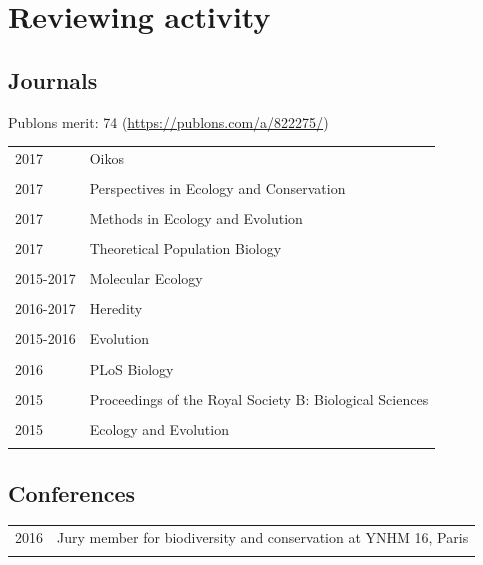 \documentclass[a4paper,10pt]{article} %
\begin{document}
\section*{Reviewing activity}
\subsection*{Journals}
Publons merit: 74 (\url{https://publons.com/a/822275/})
\begin{table}[h]
\begin{tabular}{p{4cm}|p{11cm}}
\hfill \textsc{2017} & Oikos\\
\multicolumn{2}{c}{} \\
\hfill \textsc{2017} & Perspectives in Ecology and Conservation\\
\multicolumn{2}{c}{} \\
\hfill \textsc{2017} & Methods in Ecology and Evolution\\
\multicolumn{2}{c}{} \\
\hfill \textsc{2017} & Theoretical Population Biology\\
\multicolumn{2}{c}{} \\
\hfill \textsc{2015-2017} & Molecular Ecology\\
\multicolumn{2}{c}{} \\
\hfill \textsc{2016-2017} & Heredity\\
\multicolumn{2}{c}{} \\
\hfill \textsc{2015-2016} & Evolution\\
\multicolumn{2}{c}{} \\
\hfill \textsc{2016} & PLoS Biology\\
\multicolumn{2}{c}{} \\
\hfill \textsc{2015} & Proceedings of the Royal Society B: Biological Sciences\\
\multicolumn{2}{c}{} \\
\hfill \textsc{2015} & Ecology and Evolution\\
\multicolumn{2}{c}{} \\
\end{tabular}
\end{table}

\subsection*{Conferences}
\begin{tabular}{p{4cm}|p{11cm}}
\hfill \textsc{2016} & Jury member for biodiversity and conservation at YNHM 16, Paris\\
\multicolumn{2}{c}{} \\
\end{tabular}
\end{document}

